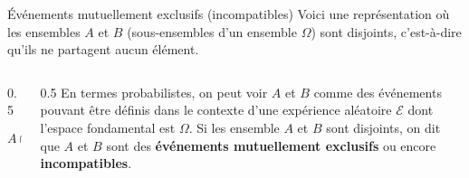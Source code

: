 \documentclass[nuit,charter,pied,handout]{BeamerJS}
\begin{document}
\begin{frame}[t]{Événements mutuellement exclusifs (incompatibles)}
\pause
 Voici une représentation où les ensembles $A$ et $B$ (sous-ensembles d'un ensemble $\Omega$) sont disjoints, c'est-à-dire qu'ils ne partagent aucun élément.\\[0.5cm]
 \pause
 \begin{columns}[c]
	\begin{column}{0.5\textwidth}
		\[A\cap B=\emptyset\]
	\end{column}
	\pause
 	\begin{column}{0.5\textwidth}
 		En termes probabilistes, on peut voir $A$ et $B$ comme des événements pouvant être définis dans le contexte d'une expérience aléatoire \(\mathcal{E}\) dont l'espace fondamental est $\Omega$. Si les ensemble $A$ et $B$ sont disjoints, on dit que $A$ et $B$ sont des \textbf{événements mutuellement exclusifs} ou encore \textbf{incompatibles}.
 	\end{column}
 \end{columns}
\end{frame}
\end{document}

